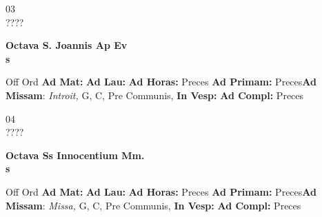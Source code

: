 \documentclass[10pt, openany]{book}
\begin{document}
    \begin{center}
        \begin{minipage}{3.5in}
            \vspace{2em}
            \begin{minipage}{0.5in}
                {\Huge 03} \\
                {\normalsize ????}
            \end{minipage}
            \begin{minipage}{3.0in}
                \textbf{ \large Octava S. Joannis Ap Ev \\
                \textnormal{\normalsize s}}

            \end{minipage}
            \begin{justify}Off Ord
                \textbf{Ad Mat: }
                \textbf{Ad Lau: }
                \textbf{Ad Horas: }Preces
                \textbf{Ad Primam: }Preces\textbf{Ad Missam}: \textit{Introit,} G, C, Pre Communis, 
                \textbf{In Vesp: }
                \textbf{Ad Compl: }Preces
            \end{justify}
        \end{minipage}
    \end{center}

    \begin{center}
        \begin{minipage}{3.5in}
            \vspace{2em}
            \begin{minipage}{0.5in}
                {\Huge 04} \\
                {\normalsize ????}
            \end{minipage}
            \begin{minipage}{3.0in}
                \textbf{ \large Octava Ss Innocentium Mm. \\
                \textnormal{\normalsize s}}

            \end{minipage}
            \begin{justify}Off Ord
                \textbf{Ad Mat: }
                \textbf{Ad Lau: }
                \textbf{Ad Horas: }Preces
                \textbf{Ad Primam: }Preces\textbf{Ad Missam}: \textit{Missa,} G, C, Pre Communis, 
                \textbf{In Vesp: }
                \textbf{Ad Compl: }Preces
            \end{justify}
        \end{minipage}
    \end{center}
\end{document}
